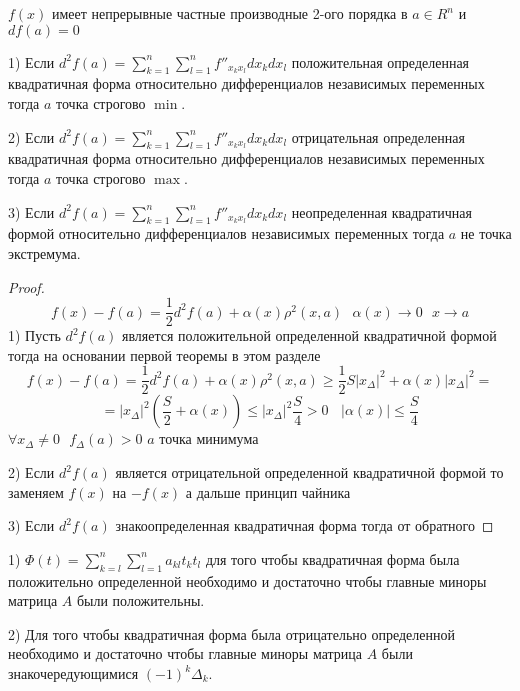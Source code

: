 \begin{theorem}
  $f(x)$ имеет непрерывные частные производные 2-ого порядка в $a \in R^n$ и
  $df(a) = 0$

  1) Если $d^2 f(a) = \sum_{k=1}^n \sum_{l=1}^n f''_{x_k x_l} dx_k dx_l$
  положительная определенная квадратичная форма относительно
  дифференциалов независимых переменных тогда $a$ точка строгово $\min$.

  2) Если $d^2 f(a) = \sum_{k=1}^n \sum_{l=1}^n f''_{x_k x_l} dx_k dx_l$
  отрицательная определенная квадратичная форма относительно
  дифференциалов независимых переменных тогда $a$ точка строгово $\max$.

  3) Если $d^2 f(a) = \sum_{k=1}^n \sum_{l=1}^n f''_{x_k x_l} dx_k dx_l$
  неопределенная квадратичная формой относительно
  дифференциалов независимых переменных тогда $a$ не точка экстремума.
\end{theorem}

\begin{proof}
  $$
  f(x) - f(a) = \frac{1}{2}d^2f(a) + \alpha(x) \rho^2(x, a) ~~~
  \alpha(x) \to 0 ~~~ x \to a
  $$
  1) Пусть $d^2f(a)$ является положительной определенной квадратичной формой
  тогда на основании первой теоремы в этом разделе
  $$
  f(x) - f(a) = \frac{1}{2} d^2f(a) + \alpha(x) \rho^2(x, a) \ge \frac{1}{2}
  S|x_{\Delta}|^2 + \alpha(x)|x_{\Delta}|^2 =
  $$
  $$
  = |x_{\Delta}|^2 \left( \frac{S}{2} + \alpha(x) \right) \le |x_{\Delta}|^2
  \frac{S}{4} > 0 ~~~~ |\alpha(x)| \le \frac{S}{4}
  $$
  $\forall x_{\Delta} \not= 0 ~~~ f_{\Delta}(a) > 0$ $a$ точка минимума

  2) Если $d^2f(a)$ является отрицательной определенной квадратичной формой то
  заменяем $f(x)$ на $-f(x)$ а дальше принцип чайника

  3) Если $d^2 f(a)$ знакоопределенная квадратичная форма тогда от обратного
\end{proof}

\begin{block}
  1) $\Phi(t) = \sum_{k=l}^n \sum_{l=1}^n a_{kl} t_k t_l$ для того чтобы
  квадратичная форма была положительно определенной необходимо и достаточно
  чтобы главные миноры матрица $A$ были положительны.

  2) Для того чтобы квадратичная форма была отрицательно определенной
  необходимо и достаточно чтобы главные миноры матрица $A$ были
  знакочередующимися $(-1)^k \Delta_k$.
\end{block}

